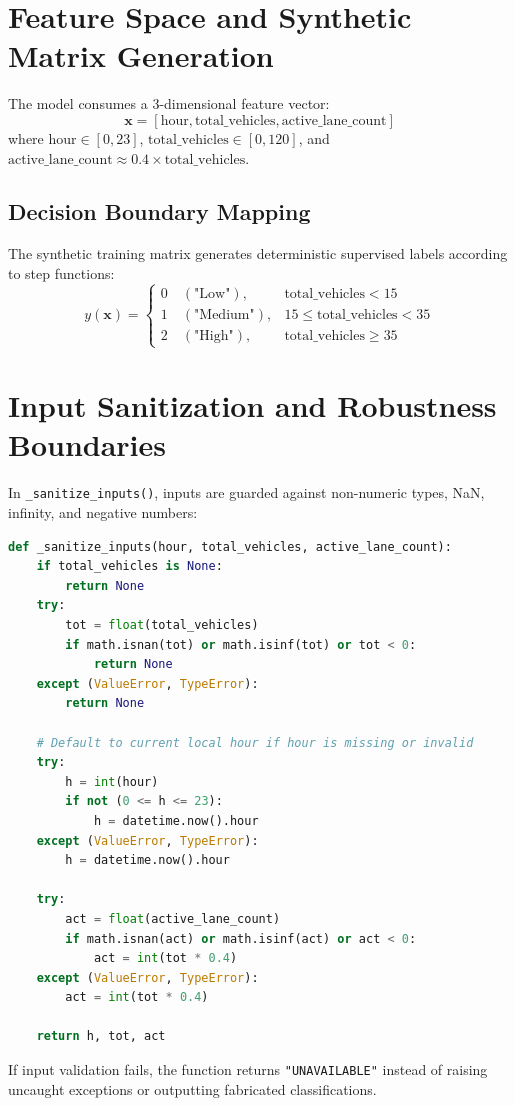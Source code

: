 \documentclass[11pt,a4paper,oneside]{report}
\begin{document}
\section{Feature Space and Synthetic Matrix Generation}
The model consumes a 3-dimensional feature vector:
\begin{equation}
\mathbf{x} = \left[ \text{hour}, \text{total\_vehicles}, \text{active\_lane\_count} \right]
\end{equation}
where $\text{hour} \in [0, 23]$, $\text{total\_vehicles} \in [0, 120]$, and $\text{active\_lane\_count} \approx 0.4 \times \text{total\_vehicles}$.

\subsection{Decision Boundary Mapping}
The synthetic training matrix generates deterministic supervised labels according to step functions:
\begin{equation}
y(\mathbf{x}) =
\begin{cases}
0 \quad (\text{"Low"}), & \text{total\_vehicles} < 15 \\
1 \quad (\text{"Medium"}), & 15 \le \text{total\_vehicles} < 35 \\
2 \quad (\text{"High"}), & \text{total\_vehicles} \ge 35
\end{cases}
\end{equation}

\section{Input Sanitization and Robustness Boundaries}
In \texttt{_sanitize_inputs()}, inputs are guarded against non-numeric types, NaN, infinity, and negative numbers:
\begin{lstlisting}[language=Python]
def _sanitize_inputs(hour, total_vehicles, active_lane_count):
    if total_vehicles is None:
        return None
    try:
        tot = float(total_vehicles)
        if math.isnan(tot) or math.isinf(tot) or tot < 0:
            return None
    except (ValueError, TypeError):
        return None

    # Default to current local hour if hour is missing or invalid
    try:
        h = int(hour)
        if not (0 <= h <= 23):
            h = datetime.now().hour
    except (ValueError, TypeError):
        h = datetime.now().hour

    try:
        act = float(active_lane_count)
        if math.isnan(act) or math.isinf(act) or act < 0:
            act = int(tot * 0.4)
    except (ValueError, TypeError):
        act = int(tot * 0.4)

    return h, tot, act
\end{lstlisting}
If input validation fails, the function returns \texttt{"UNAVAILABLE"} instead of raising uncaught exceptions or outputting fabricated classifications.
\end{document}

